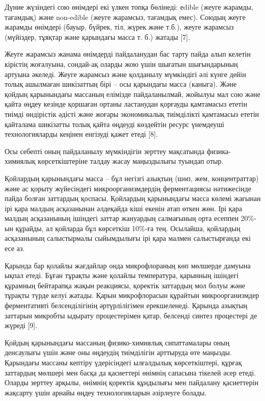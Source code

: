 Дүние жүзіндегі сою өнімдері екі үлкен топқа бөлінеді: еdible (жеуге
жарамды, тағамдық) және non-edible (жеуге жарамсыз, тағамдық емес).
Союдың жеуге жарамды өнімдері (бауыр, бүйрек, тіл, жүрек және т.б.),
жеуге жарамсыз (мүйіздер, тұяқтар және қарындағы масса т. б.) жатады
{[}7{]}.

Жеуге жарамсыз жанама өнімдерді пайдаланудан бас тарту пайда алып
келетін кірістің жоғалуына, сондай-ақ оларды жою үшін шығатын
шығындарының артуына әкеледі. Жеуге жарамсыз және қолданылу мүмкіндігі
әлі күнге дейін толық ашылмаған шикізаттың бірі -- осы қарындағы масса
(каныга). Және қойдың қарынындағы массаның елімізде пайдаланылмай,
жойылуы мал сою және қайта өңдеу кезінде қоршаған ортаны ластанудан
қорғауды қамтамасыз ететін тиімді өндірістік әдісті және жоғары
экономикалық тиімділікті қамтамасыз ететін қайталама шикізатты толық
қайта өңдеуді көздейтін ресурс үнемдеуші технологияларды кеңінен
енгізуді қажет етеді {[}8{]}.

Осы себепті оның пайдаланылу мүмкіндігін зерттеу мақсатында
физика-химиялық көрсеткіштеріне талдау жасау маңыздылығы туындап отыр.

Қойлардың қарынындағы масса -- бұл негізгі азықтың (шөп, жем,
концентраттар) және ас қорыту жүйесіндегі микроорганизмдердің
ферментациясы нәтижесінде пайда болған заттардың қоспасы. Қойлардың
қарынындағы масса көлемі жағынан ірі қара малдың асқазанынан әлдеқайда
кіші екенін атап өткен жөн. Ірі қара малдың асқазанының ішіндегі заттар
жануардың салмағының орта есеппен 20\%-ын құрайды, ал қойларда бұл
көрсеткіш 10\%-ға тең. Осылайша, қойлардың асқазанының салыстырмалы
сыйымдылығы ірі қара малмен салыстырғанда екі есе аз.

Қарында бар қолайлы жағдайлар онда микрофлораның көп мөлшерде дамуына
ықпал етеді. Бұған тұрақты және қолайлы температура, қарынның ішіндегі
құрамның бейтарапқа жақын реакциясы, қоректік заттардың мол болуы және
тұрақты түрде келуі жатады. Қарын микрофлорасын құрайтын
микроорганизмдер ферментативті белсенділігінің әртүрлілігімен
ерекшеленеді. Қарында азықтың заттарын микробты ыдырату процестерімен
қатар, белсенді синтез процестері де жүреді {[}9{]}.

Қойдың қарынындағы массаның физико-химиялық сипаттамалары оның
денсаулығы үшін және оны өңдеудің тиімділігін арттыруда өте маңызды.
Қарындағы массаны кептіру үдерісіндегі ылғалдылық көрсеткіштері, құрғақ
заттардың мөлшері мен басқа да қасиеттері өнімнің сапасына тікелей әсер
етеді. Оларды зерттеу арқылы, өнімнің қоректік құндылығы мен пайдалану
қасиеттерін жақсарту үшін арнайы өңдеу технологияларын әзірлеуге болады.

